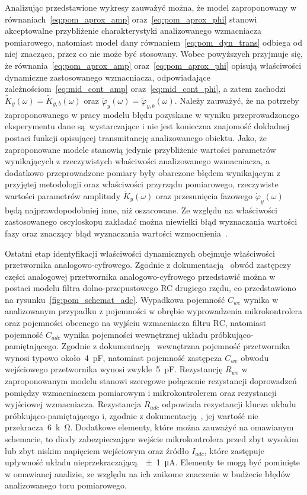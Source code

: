 Analizując przedstawione wykresy zauważyć można, że model zaproponowany w równaniach~\eqref{eq:pom_aprox_amp} oraz~\eqref{eq:pom_aprox_phi} stanowi akceptowalne przybliżenie charakterystyki analizowanego wzmacniacza pomiarowego, natomiast model dany równaniem~\eqref{eq:pom_dyn_trans} odbiega od niej znacząco, przez co nie może być stosowany. Wobec powyższych przyjmuje się, że równania~\eqref{eq:pom_aprox_amp} oraz~\eqref{eq:pom_aprox_phi} opisują właściwości dynamiczne zastosowanego wzmacniacza, odpowiadające zależnościom~\eqref{eq:mid_cont_amp} oraz~\eqref{eq:mid_cont_phi}, a zatem zachodzi $\tilde{K}_{y}(\omega) = \tilde{K}_{y,b}(\omega)$ oraz $\tilde{\varphi}_{y}(\omega) = \tilde{\varphi}_{y,b}(\omega)$. Należy zauważyć, że na potrzeby zaproponowanego w pracy modelu błędu pozyskane w wyniku przeprowadzonego eksperymentu dane są wystarczające i nie jest konieczna znajomość dokładnej postaci funkcji opisującej transmitancję analizowanego obiektu. Jako, że zaproponowane modele stanowią jedynie przybliżenie wartości parametrów wynikających z rzeczywistych właściwości analizowanego wzmacniacza, a dodatkowo przeprowadzone pomiary były obarczone błędem wynikającym z przyjętej metodologii oraz właściwości przyrządu pomiarowego, rzeczywiste wartości parametrów amplitudy $\dot{K}_{y}(\omega)$ oraz przesunięcia fazowego $\dot{\varphi}_{y}(\omega)$ będą najprawdopodobniej inne, niż oszacowane. Ze względu na właściwości zastosowanego oscyloskopu zakładać można niewielki błąd wyznaczania wartości fazy oraz znaczący błąd wyznaczania wartości wzmocnienia~\cite{rigol_dso}.

Ostatni etap identyfikacji właściwości dynamicznych obejmuje właściwości przetwornika analogowo-cyfrowego. Zgodnie z dokumentacją~\cite{stm_f411} obwód zastępczy części analogowej przetwornika analogowo-cyfrowego przedstawić można w postaci modelu filtra dolno-przepustowego RC drugiego rzędu, co przedstawiono na rysunku~\ref{fig:pom_schemat_adc}. Wypadkowa pojemność $C_{we}$ wynika w analizowanym przypadku z pojemności w obrębie wyprowadzenia mikrokontrolera oraz pojemności obecnego na wyjściu wzmacniacza filtru RC, natomiast pojemność $C_{adc}$ wynika pojemności wewnętrznej układu próbkująco-pamiętającego. Zgodnie z dokumentacją~\cite{stm_f411} wewnętrzna pojemność przetwornika wynosi typowo około~\qty{4}{pF}, natomiast pojemność zastępcza $C_{we}$ obwodu wejściowego przetwornika wynosi zwykle~\qty{5}{pF}. Rezystancję $R_{we}$ w zaproponowanym modelu stanowi szeregowe połączenie rezystancji doprowadzeń pomiędzy wzmacniaczem pomiarowym i mikrokontrolerem oraz rezystancji wyjściowej wzmacniacza. Rezystancja $R_{adc}$ odpowiada rezystancji klucza układu próbkująco-pamiętającego i, zgodnie z dokumentacją~\cite{stm_f411}, jej wartość nie przekracza~\qty{6}{k\ohm}. Dodatkowe elementy, które można zauważyć na omawianym schemacie, to diody zabezpieczające wejście mikrokontrolera przed zbyt wysokim lub zbyt niskim napięciem wejściowym oraz źródło $I_{adc}$, które zastępuje upływność układu nieprzekraczającą~\qty{\pm 1}{\micro A}. Elementy te mogą być pominięte w omawianej analizie, ze względu na ich znikome znaczenie w budżecie błędów analizowanego toru pomiarowego.


